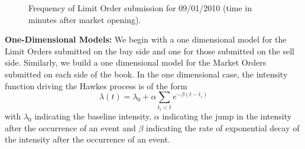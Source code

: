 	\begin{figure}[!ht]
	\centering
	\caption{Frequency of Limit Order submission for 09/01/2010 (time in minutes after market opening). \label{fig:freqsubmit2}}
	\end{figure}


\noindent\textbf{One-Dimensional Models:} We begin with a one dimensional model for the Limit Orders submitted on the buy side and one for those submitted on the sell side. Similarly, we build a one dimensional model for the Market Orders submitted on each side of the book. In the one dimensional case, the intensity function driving the Hawkes process is of the form
	\begin{equation}\label{eqn:lambda6}
	\lambda(t)= \lambda_0 + \alpha \sum_{t_i<t} e^{-\beta(t-t_i)}
	\end{equation}
with $\lambda_0$ indicating the baseline intensity, $\alpha$ indicating the jump in the intensity after the occurrence of an event and $\beta$ indicating the rate of exponential decay of the intensity after the occurrence of an event.


